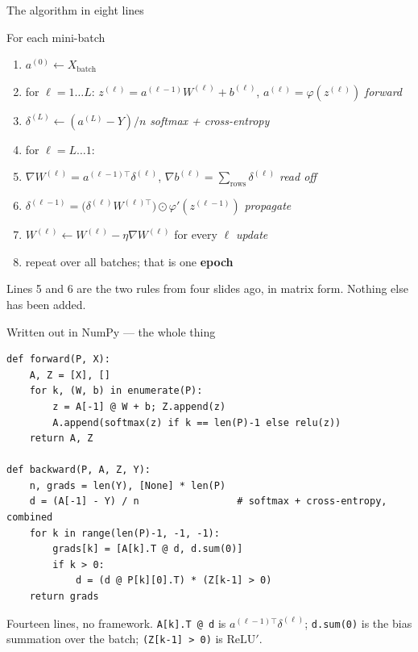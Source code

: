 \documentclass[aspectratio=169]{beamer}
\begin{document}
\begin{frame}[shrink=6]{The algorithm in eight lines}
  \begin{block}{For each mini-batch}
    \small
    \begin{enumerate}
      \item $a^{(0)} \leftarrow X_{\text{batch}}$
      \item for $\ell = 1 \dots L$: \;
        $z^{(\ell)} = a^{(\ell-1)}W^{(\ell)} + b^{(\ell)}$, \;
        $a^{(\ell)} = \varphi(z^{(\ell)})$ \hfill \emph{forward}
      \item $\delta^{(L)} \leftarrow (a^{(L)} - Y)/n$
        \hfill \emph{softmax + cross-entropy}
      \item for $\ell = L \dots 1$:
      \item \quad $\nabla W^{(\ell)} = a^{(\ell-1)\top}\delta^{(\ell)}$, \;
        $\nabla b^{(\ell)} = \textstyle\sum_{\text{rows}} \delta^{(\ell)}$
        \hfill \emph{read off}
      \item \quad $\delta^{(\ell-1)} =
        \big(\delta^{(\ell)}W^{(\ell)\top}\big)\odot\varphi'(z^{(\ell-1)})$
        \hfill \emph{propagate}
      \item $W^{(\ell)} \leftarrow W^{(\ell)} - \eta\nabla W^{(\ell)}$ for
        every $\ell$ \hfill \emph{update}
      \item repeat over all batches; that is one \textbf{epoch}
    \end{enumerate}
  \end{block}
  \begin{center}\small
    Lines 5 and 6 are the two rules from four slides ago, in matrix form.
    Nothing else has been added.
  \end{center}
\end{frame}

\begin{frame}[fragile,shrink=8]{Written out in NumPy --- the whole thing}
\begin{lstlisting}
def forward(P, X):
    A, Z = [X], []
    for k, (W, b) in enumerate(P):
        z = A[-1] @ W + b; Z.append(z)
        A.append(softmax(z) if k == len(P)-1 else relu(z))
    return A, Z

def backward(P, A, Z, Y):
    n, grads = len(Y), [None] * len(P)
    d = (A[-1] - Y) / n                 # softmax + cross-entropy, combined
    for k in range(len(P)-1, -1, -1):
        grads[k] = [A[k].T @ d, d.sum(0)]
        if k > 0:
            d = (d @ P[k][0].T) * (Z[k-1] > 0)
    return grads
\end{lstlisting}
  \begin{center}\small
    Fourteen lines, no framework. \texttt{A[k].T @ d} is
    $a^{(\ell-1)\top}\delta^{(\ell)}$; \texttt{d.sum(0)} is the bias
    summation over the batch; \texttt{(Z[k-1] > 0)} is
    $\mathrm{ReLU}'$.
  \end{center}
\end{frame}
\end{document}
